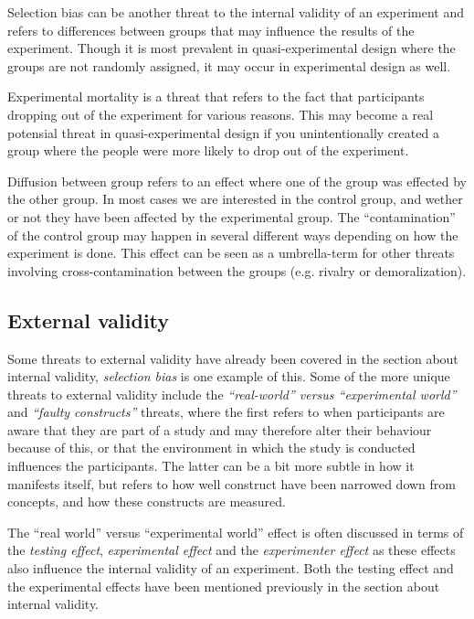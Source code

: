 	\bigskip\noindent
	Selection bias can be another threat to the internal validity of an experiment and refers to differences between groups that may influence the results of the experiment. Though it is most prevalent in quasi-experimental design where the groups are not randomly assigned, it may occur in experimental design as well. 
	
	\bigskip\noindent
	Experimental mortality is a threat that refers to the fact that participants dropping out of the experiment for various reasons. This may become a real potensial threat in quasi-experimental design if you unintentionally created a group where the people were more likely to drop out of the experiment.
	
	\bigskip\noindent
	Diffusion between group refers to an effect where one of the group was effected by the other group. In most cases we are interested in the control group, and wether or not they have been affected by the experimental group. The "`contamination"' of the control group may happen in several different ways depending on how the experiment is done. 
	This effect can be seen as a umbrella-term for other threats involving cross-contamination between the groups (e.g. rivalry or demoralization).
	
	\subsection{External validity}
	Some threats to external validity have already been covered in the section about internal validity, \textit{selection bias} is one example of this. 
	Some of the more unique threats to external validity include the \textit{"`real-world"' versus "`experimental world"'} and \textit{"`faulty constructs"'} threats, where the first refers to when participants are aware that they are part of a study and may therefore alter their behaviour because of this, or that the environment in which the study is conducted influences the participants. The latter can be a bit more subtle in how it manifests itself, but refers to how well construct have been narrowed down from concepts, and how these constructs are measured.
	
	\bigskip\noindent
	The "`real world"' versus "`experimental world"' effect is often discussed in terms of the \textit{testing effect}, \textit{experimental effect} and the \textit{experimenter effect} as these effects also influence the internal validity of an experiment. Both the testing effect and the experimental effects have been mentioned previously in the section about internal validity.
	
